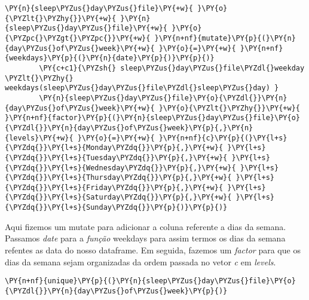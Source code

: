 \begin{tcolorbox}[breakable, size=fbox, boxrule=1pt, pad at break*=1mm,colback=cellbackground, colframe=cellborder]
    \begin{Verbatim}[commandchars=\\\{\}]
        \PY{n}{sleep\PYZus{}day\PYZus{}file}\PY{+w}{ }\PY{o}{\PYZlt{}\PYZhy{}}\PY{+w}{ }\PY{n}{sleep\PYZus{}day\PYZus{}file}\PY{+w}{ }\PY{o}{\PYZpc{}\PYZgt{}\PYZpc{}}\PY{+w}{ }\PY{n+nf}{mutate}\PY{p}{(}\PY{n}{day\PYZus{}of\PYZus{}week}\PY{+w}{ }\PY{o}{=}\PY{+w}{ }\PY{n+nf}{weekdays}\PY{p}{(}\PY{n}{date}\PY{p}{)}\PY{p}{)}
        \PY{c+c1}{\PYZsh{} sleep\PYZus{}day\PYZus{}file\PYZdl{}weekday \PYZlt{}\PYZhy{} weekdays(sleep\PYZus{}day\PYZus{}file\PYZdl{}sleep\PYZus{}day) }
        \PY{n}{sleep\PYZus{}day\PYZus{}file}\PY{o}{\PYZdl{}}\PY{n}{day\PYZus{}of\PYZus{}week}\PY{+w}{ }\PY{o}{\PYZlt{}\PYZhy{}}\PY{+w}{ }\PY{n+nf}{factor}\PY{p}{(}\PY{n}{sleep\PYZus{}day\PYZus{}file}\PY{o}{\PYZdl{}}\PY{n}{day\PYZus{}of\PYZus{}week}\PY{p}{,}\PY{n}{levels}\PY{+w}{ }\PY{o}{=}\PY{+w}{ }\PY{n+nf}{c}\PY{p}{(}\PY{l+s}{\PYZdq{}}\PY{l+s}{Monday\PYZdq{}}\PY{p}{,}\PY{+w}{ }\PY{l+s}{\PYZdq{}}\PY{l+s}{Tuesday\PYZdq{}}\PY{p}{,}\PY{+w}{ }\PY{l+s}{\PYZdq{}}\PY{l+s}{Wednesday\PYZdq{}}\PY{p}{,}\PY{+w}{ }\PY{l+s}{\PYZdq{}}\PY{l+s}{Thursday\PYZdq{}}\PY{p}{,}\PY{+w}{ }\PY{l+s}{\PYZdq{}}\PY{l+s}{Friday\PYZdq{}}\PY{p}{,}\PY{+w}{ }\PY{l+s}{\PYZdq{}}\PY{l+s}{Saturday\PYZdq{}}\PY{p}{,}\PY{+w}{ }\PY{l+s}{\PYZdq{}}\PY{l+s}{Sunday\PYZdq{}}\PY{p}{)}\PY{p}{)}
    \end{Verbatim}
\end{tcolorbox}

Aqui fizemos um mutate para adicionar a coluna referente a dias da
semana. Passamos \emph{date} para a \emph{função} weekdays para assim
termos os dias da semana refentes as data do nosso dataframe. Em
seguida, fazemos um \emph{factor} para que os dias da semana sejam
organizadas da ordem passada no vetor \emph{c} em \emph{levels}.

\begin{tcolorbox}[breakable, size=fbox, boxrule=1pt, pad at break*=1mm,colback=cellbackground, colframe=cellborder]
    \begin{Verbatim}[commandchars=\\\{\}]
        \PY{n+nf}{unique}\PY{p}{(}\PY{n}{sleep\PYZus{}day\PYZus{}file}\PY{o}{\PYZdl{}}\PY{n}{day\PYZus{}of\PYZus{}week}\PY{p}{)}
    \end{Verbatim}
\end{tcolorbox}


